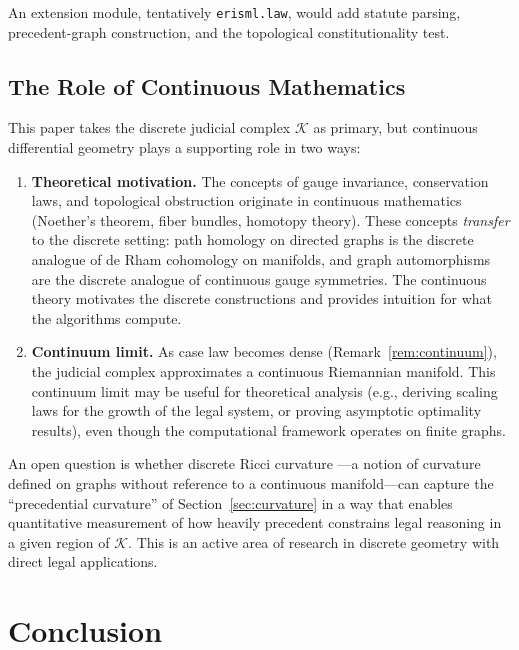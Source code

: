\documentclass[12pt]{article}
\theoremstyle{definition}
\theoremstyle{remark}
\begin{document}
An extension module, tentatively \texttt{erisml.law}, would add statute parsing, precedent-graph construction, and the topological constitutionality test.

\subsection{The Role of Continuous Mathematics}
\label{sec:discrete}

This paper takes the discrete judicial complex $\mathcal{K}$ as primary, but continuous differential geometry plays a supporting role in two ways:

\begin{enumerate}
    \item \textbf{Theoretical motivation.}  The concepts of gauge invariance, conservation laws, and topological obstruction originate in continuous mathematics (Noether's theorem, fiber bundles, homotopy theory).  These concepts \emph{transfer} to the discrete setting: path homology on directed graphs is the discrete analogue of de Rham cohomology on manifolds, and graph automorphisms are the discrete analogue of continuous gauge symmetries.  The continuous theory motivates the discrete constructions and provides intuition for what the algorithms compute.

    \item \textbf{Continuum limit.}  As case law becomes dense (Remark~\ref{rem:continuum}), the judicial complex approximates a continuous Riemannian manifold.  This continuum limit may be useful for theoretical analysis (e.g., deriving scaling laws for the growth of the legal system, or proving asymptotic optimality results), even though the computational framework operates on finite graphs.
\end{enumerate}

An open question is whether discrete Ricci curvature \cite{ollivier2009}---a notion of curvature defined on graphs without reference to a continuous manifold---can capture the ``precedential curvature'' of Section~\ref{sec:curvature} in a way that enables quantitative measurement of how heavily precedent constrains legal reasoning in a given region of $\mathcal{K}$.  This is an active area of research in discrete geometry with direct legal applications.


\section{Conclusion}
\label{sec:conclusion}
\end{document}
